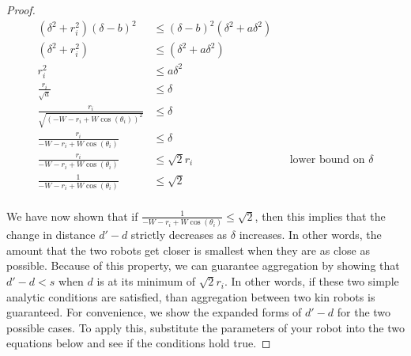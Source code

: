 \documentclass[conference]{IEEEtran}
\begin{document}
\begin{proof}
{\begin{align*}
        (\delta^2 + r_i^2)(\delta-b)^2 &\leq (\delta-b)^2(\delta^2 + a\delta^2) \\
        (\delta^2 + r_i^2) &\leq (\delta^2 + a\delta^2) \\
        r_i^2 &\leq a\delta^2 \\
        \frac{r_i}{\sqrt{a}} &\leq \delta \\
        \frac{r_i}{\sqrt{(-W-r_i+W\cos(\theta_i))^2}} &\leq \delta \\
        \frac{r_i}{-W-r_i+W\cos(\theta_i)} &\leq \delta \\
        \frac{r_i}{-W-r_i+W\cos(\theta_i)} &\leq \sqrt{2}r_i && \text{lower bound on }\delta \\
        \frac{1}{-W-r_i+W\cos(\theta_i)} &\leq \sqrt{2} \\
      \end{align*}

      We have now shown that if $\frac{1}{-W-r_i+W\cos(\theta_i)} \leq \sqrt{2}$, then this implies that the change in distance $d'-d$ strictly decreases as $\delta$ increases. In other words, the amount that the two robots get closer is smallest when they are as close as possible. Because of this property, we can guarantee aggregation by showing that $d'-d<s$ when $d$ is at its minimum of $\sqrt{2}r_i$. In other words, if these two simple analytic conditions are satisfied, than aggregation between two kin robots is guaranteed. For convenience, we show the expanded forms of $d'-d$ for the two possible cases. To apply this, substitute the parameters of your robot into the two equations below and see if the conditions hold true.

    }

  \end{proof}
\end{document}
